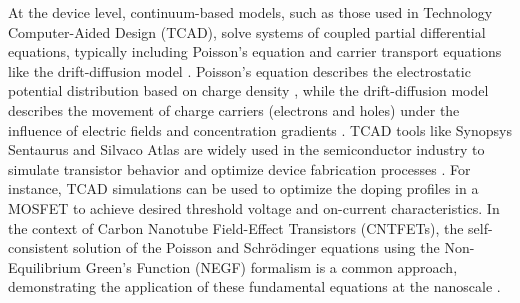 At the device level, continuum-based models, such as those used in Technology Computer-Aided Design (TCAD), solve systems of coupled partial differential equations, typically including Poisson's equation and carrier transport equations like the drift-diffusion model \citep{markowichDrift1990}. Poisson's equation describes the electrostatic potential distribution based on charge density \citep{delavariNernst2021}, while the drift-diffusion model describes the movement of charge carriers (electrons and holes) under the influence of electric fields and concentration gradients \citep{markowichDrift1990}. TCAD tools like Synopsys Sentaurus and Silvaco Atlas are widely used in the semiconductor industry to simulate transistor behavior and optimize device fabrication processes \citep{tungaPhysicsBased2023}. For instance, TCAD simulations can be used to optimize the doping profiles in a MOSFET to achieve desired threshold voltage and on-current characteristics.  In the context of Carbon Nanotube Field-Effect Transistors (CNTFETs), the self-consistent solution of the Poisson and Schrödinger equations using the Non-Equilibrium Green's Function (NEGF) formalism is a common approach, demonstrating the application of these fundamental equations at the nanoscale \citep{hassaniniaSimulation2008,zandShortChannel2020}. 

